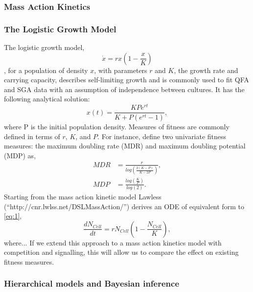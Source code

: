 \begin{multicols}{2}
\subsubsection{Mass Action Kinetics}


\subsubsection{The Logistic Growth Model}

The logistic growth model,
\begin{equation}
  \label{eq:1}
  \dot{x} = rx\left(1 - \frac{x}{K}\right)
\end{equation}
\citep{Verhulst1845}, for a population of density \(x\), with parameters \(r\) and \(K\),
the growth rate and carrying capacity, describes self-limiting growth and is commonly used
to fit QFA and SGA data with an assumption of independence between cultures. It has the
following analytical solution:
\begin{equation}
  \label{eq:2}
  x(t) = \frac{KPe^{rt}}{K + P(e^{rt}-1)},
\end{equation}
where P is the initial population density. Measures of fitness are commonly defined in
terms of \(r\), \(K\), and \(P\). For instance, \cite{Addinall2011} define two univariate fitness
measures: the maximum doubling rate (MDR) and maximum doubling potential (MDP) as,
\begin{subequations}
  \label{eq:3}
    \begin{align}
      MDR &= \frac{r}{log\left(\frac{2(K-P)}{K-2P}\right)},\\
      MDP &= \frac{log\left(\frac{K}{P}\right)}{log(2)}.
    \end{align}
\end{subequations}
Starting from the mass action kinetic model Lawless (``http://cnr.lwlss.net/DSLMassAction/'')
derives an ODE of equivalent form to \ref{eq:1},
\begin{equation}
  \label{eq:8}
  \frac{dN_{Cell}}{dt} = rN_{Cell}\left(1 - \frac{N_{Cell}}{K}\right),
\end{equation}
where...  If we extend this approach to a mass action kinetics model with competition and
signalling, this will allow us to compare the effect on existing fitness
measures.


\subsubsection{Hierarchical models and Bayesian inference}

\end{multicols}
